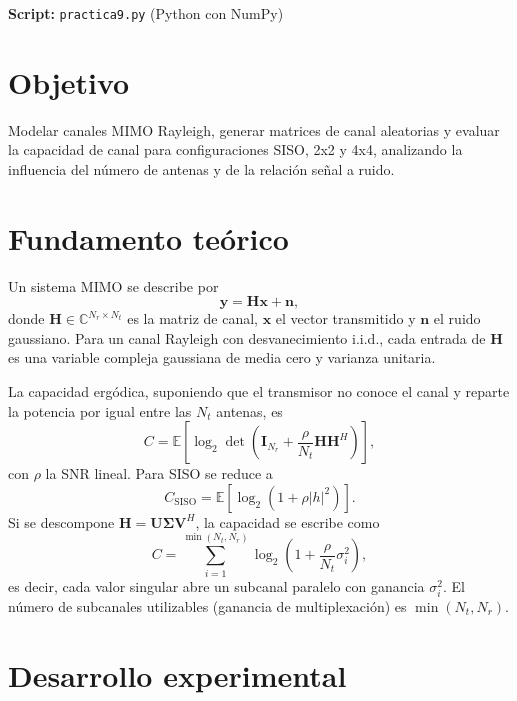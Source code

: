 \documentclass[11pt,a4paper]{article}
\begin{document}

\textbf{Script:} \texttt{practica9.py} (Python con NumPy)

\section{Objetivo}

Modelar canales MIMO Rayleigh, generar matrices de canal aleatorias y evaluar la capacidad
de canal para configuraciones SISO, 2x2 y 4x4, analizando la influencia del número de
antenas y de la relación señal a ruido.

\section{Fundamento teórico}

Un sistema MIMO se describe por
\begin{equation}
  \mathbf{y} = \mathbf{H}\mathbf{x} + \mathbf{n},
\end{equation}
donde $\mathbf{H}\in\mathbb{C}^{N_r\times N_t}$ es la matriz de canal, $\mathbf{x}$ el
vector transmitido y $\mathbf{n}$ el ruido gaussiano. Para un canal Rayleigh con
desvanecimiento i.i.d., cada entrada de $\mathbf{H}$ es una variable compleja gaussiana de
media cero y varianza unitaria.

La capacidad ergódica, suponiendo que el transmisor no conoce el canal y reparte la
potencia por igual entre las $N_t$ antenas, es
\begin{equation}
  C = \mathbb{E}\left[\log_2\det\left(\mathbf{I}_{N_r}
      + \frac{\rho}{N_t}\mathbf{H}\mathbf{H}^{H}\right)\right],
\end{equation}
con $\rho$ la SNR lineal. Para SISO se reduce a
\begin{equation}
  C_{\mathrm{SISO}} = \mathbb{E}\left[\log_2\left(1+\rho|h|^2\right)\right].
\end{equation}
Si se descompone $\mathbf{H}=\mathbf{U}\boldsymbol{\Sigma}\mathbf{V}^{H}$, la capacidad se
escribe como
\begin{equation}
  C = \sum_{i=1}^{\min(N_t,N_r)}
      \log_2\left(1+\frac{\rho}{N_t}\sigma_i^2\right),
\end{equation}
es decir, cada valor singular abre un subcanal paralelo con ganancia $\sigma_i^2$. El
número de subcanales utilizables (ganancia de multiplexación) es
$\min(N_t,N_r)$.

\section{Desarrollo experimental}
\end{document}
